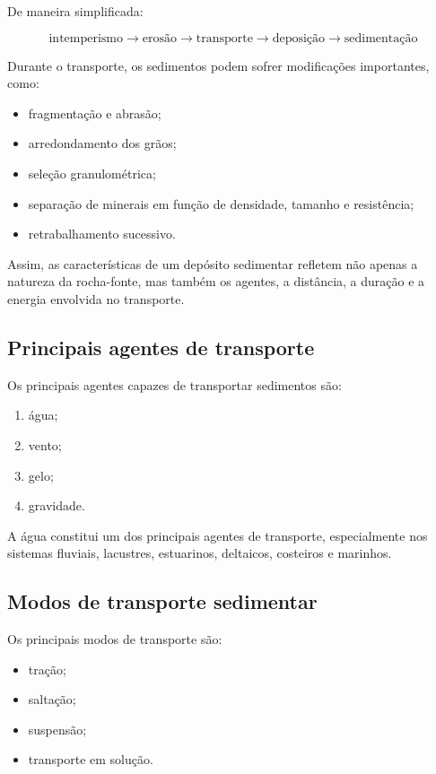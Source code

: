 \documentclass[a4paper,12pt]{article}
\theoremstyle{definition}
\theoremstyle{definition}
\theoremstyle{definition}
\begin{document}
De maneira simplificada:

\[
\boxed{
\text{intemperismo}
\rightarrow
\text{erosão}
\rightarrow
\text{transporte}
\rightarrow
\text{deposição}
\rightarrow
\text{sedimentação}
}
\]

Durante o transporte, os sedimentos podem sofrer modificações importantes, como:

\begin{itemize}
    \item fragmentação e abrasão;
    \item arredondamento dos grãos;
    \item seleção granulométrica;
    \item separação de minerais em função de densidade, tamanho e resistência;
    \item retrabalhamento sucessivo.
\end{itemize}

Assim, as características de um depósito sedimentar refletem não apenas a
natureza da rocha-fonte, mas também os agentes, a distância, a duração e a
energia envolvida no transporte.

\subsection{Principais agentes de transporte}

Os principais agentes capazes de transportar sedimentos são:

\begin{enumerate}
    \item água;
    \item vento;
    \item gelo;
    \item gravidade.
\end{enumerate}

A água constitui um dos principais agentes de transporte, especialmente nos
sistemas fluviais, lacustres, estuarinos, deltaicos, costeiros e marinhos.

\subsection{Modos de transporte sedimentar}

Os principais modos de transporte são:

\begin{itemize}
    \item tração;
    \item saltação;
    \item suspensão;
    \item transporte em solução.
\end{itemize}
\end{document}
